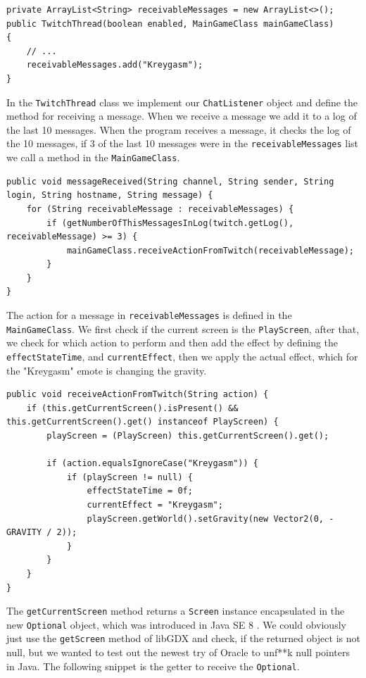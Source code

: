 \documentclass[12p]{article}
\begin{document}
\begin{verbatim}
private ArrayList<String> receivableMessages = new ArrayList<>();
public TwitchThread(boolean enabled, MainGameClass mainGameClass)
{
    // ...
    receivableMessages.add("Kreygasm");
}
\end{verbatim}

In the \texttt{TwitchThread} class we implement our \texttt{ChatListener} object and define the method for receiving a message. When we receive a message we add it to a log of the last 10 messages. When the program receives a message, it checks the log of the 10 messages, if 3 of the last 10 messages were in the \texttt{receivableMessages} list we call a method in the \texttt{MainGameClass}.

\begin{verbatim}
public void messageReceived(String channel, String sender, String login, String hostname, String message) {
    for (String receivableMessage : receivableMessages) {
        if (getNumberOfThisMessagesInLog(twitch.getLog(), receivableMessage) >= 3) {
            mainGameClass.receiveActionFromTwitch(receivableMessage);
        }
    }
}
\end{verbatim}

The action for a message in \texttt{receivableMessages} is defined in the \texttt{MainGameClass}. We first check if the current screen is the \texttt{PlayScreen}, after that, we check for which action to perform and then add the effect by defining the \texttt{effectStateTime}, and \texttt{currentEffect}, then we apply the actual effect, which for the "Kreygasm" emote is changing the gravity.

\begin{verbatim}
public void receiveActionFromTwitch(String action) {
	if (this.getCurrentScreen().isPresent() && this.getCurrentScreen().get() instanceof PlayScreen) {
		playScreen = (PlayScreen) this.getCurrentScreen().get();

		if (action.equalsIgnoreCase("Kreygasm")) {
		    if (playScreen != null) {
		        effectStateTime = 0f;
		        currentEffect = "Kreygasm";
                playScreen.getWorld().setGravity(new Vector2(0, - GRAVITY / 2));
            }
		}
	}
}
\end{verbatim}

The \texttt{getCurrentScreen} method returns a \texttt{Screen} instance encapsulated in the new \texttt{Optional} object, which was introduced in Java SE 8 \cite{JavaOptional}. We could obviously just use the \texttt{getScreen} method of libGDX and check, if the returned object is not null, but we wanted to test out the newest try of Oracle to unf**k null pointers in Java. The following snippet is the getter to receive the \texttt{Optional}.
\end{document}
